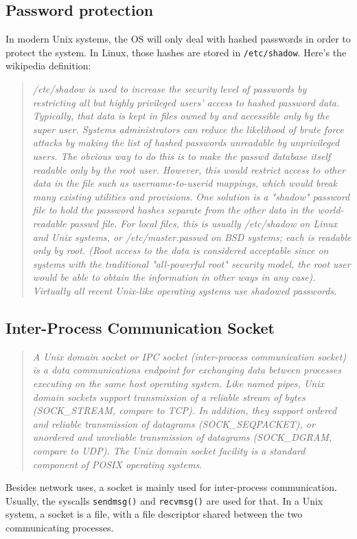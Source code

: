 \documentclass{42-en}
\begin{document}
    \subsection{Password protection}
        In modern Unix systems, the OS will only deal with hashed passwords
        in order to protect the system. In Linux, those hashes are stored in
        \texttt{/etc/shadow}. Here's the wikipedia definition:
        \begin{quotation}
            \textit{/etc/shadow is used to increase the security level of
            passwords by restricting all but highly privileged users' access to
            hashed password data. Typically, that data is kept in files owned
            by and accessible only by the super user.
            Systems administrators can reduce the likelihood of brute force
            attacks by making the list of hashed passwords unreadable by
            unprivileged users. The obvious way to do this is to make the
            passwd database itself readable only by the root user. However,
            this would restrict access to other data in the file such as
            username-to-userid mappings, which would break many existing
            utilities and provisions. One solution is a "shadow" password file
            to hold the password hashes separate from the other data in the
            world-readable passwd file. For local files, this is usually
            /etc/shadow on Linux and Unix systems, or /etc/master.passwd on BSD
            systems; each is readable only by root. (Root access to the data is
            considered acceptable since on systems with the traditional
            "all-powerful root" security model, the root user would be able to
            obtain the information in other ways in any case). Virtually all
            recent Unix-like operating systems use shadowed passwords.}
        \end{quotation}
    \newpage
    \subsection{Inter-Process Communication Socket}
        \begin{quotation}
            \textit{A Unix domain socket or IPC socket (inter-process
            communication socket) is a data communications endpoint for
            exchanging data between processes executing on the same host
            operating system. Like named pipes, Unix domain sockets support
            transmission of a reliable stream of bytes (SOCK\_STREAM, compare to
            TCP). In addition, they support ordered and reliable transmission
            of datagrams (SOCK\_SEQPACKET), or unordered and unreliable
            transmission of datagrams (SOCK\_DGRAM, compare to UDP). The Unix
            domain socket facility is a standard component of POSIX operating
            systems.}
        \end{quotation}
        Besides network uses, a socket is mainly used for inter-process
        communication. Usually, the syscalls \texttt{sendmsg()} and
        \texttt{recvmsg()} are used for that. In a Unix system, a socket is a
        file, with a file descriptor shared between the two communicating
        processes.
\end{document}
